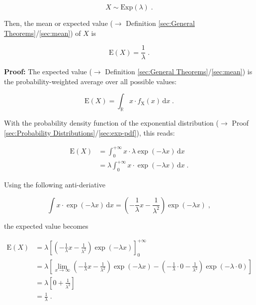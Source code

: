 \documentclass[a4paper,12pt,twoside]{book}
\begin{document}
\begin{equation} \label{eq:exp-mean-exp}
X \sim \mathrm{Exp}(\lambda) \; .
\end{equation}

Then, the mean or expected value ($\rightarrow$ Definition \ref{sec:General Theorems}/\ref{sec:mean}) of $X$ is

\begin{equation} \label{eq:exp-mean-exp-mean}
\mathrm{E}(X) = \frac{1}{\lambda} \; .
\end{equation}


\vspace{1em}
\textbf{Proof:} The expected value ($\rightarrow$ Definition \ref{sec:General Theorems}/\ref{sec:mean}) is the probability-weighted average over all possible values:

\begin{equation} \label{eq:exp-mean-mean}
\mathrm{E}(X) = \int_{\mathbb{R}} x \cdot f_\mathrm{X}(x) \, \mathrm{d}x \; .
\end{equation}

With the probability density function of the exponential distribution ($\rightarrow$ Proof \ref{sec:Probability Distributions}/\ref{sec:exp-pdf}), this reads:

\begin{equation} \label{eq:exp-mean-exp-mean-s1}
\begin{split}
\mathrm{E}(X) &= \int_{0}^{+\infty} x \cdot \lambda \exp(-\lambda x) \, \mathrm{d}x \\
&= \lambda \int_{0}^{+\infty} x \cdot \exp(-\lambda x) \, \mathrm{d}x \; .
\end{split}
\end{equation}

Using the following anti-deriative

\begin{equation} \label{eq:exp-mean-exp-mean-s2}
\int x \cdot \exp(-\lambda x) \, \mathrm{d}x = \left( - \frac{1}{\lambda} x - \frac{1}{\lambda^2} \right) \exp(-\lambda x) \; ,
\end{equation}

the expected value becomes

\begin{equation} \label{eq:exp-mean-exp-mean-s3}
\begin{split}
\mathrm{E}(X) &= \lambda \left[ \left( - \frac{1}{\lambda} x - \frac{1}{\lambda^2} \right) \exp(-\lambda x) \right]_{0}^{+\infty} \\
&= \lambda \left[ \lim_{x \to \infty} \left( - \frac{1}{\lambda} x - \frac{1}{\lambda^2} \right) \exp(-\lambda x) - \left( - \frac{1}{\lambda} \cdot 0 - \frac{1}{\lambda^2} \right) \exp(-\lambda \cdot 0) \right] \\
&= \lambda \left[ 0 + \frac{1}{\lambda^2} \right] \\
&= \frac{1}{\lambda} \; .
\end{split}
\end{equation}
\end{document}
